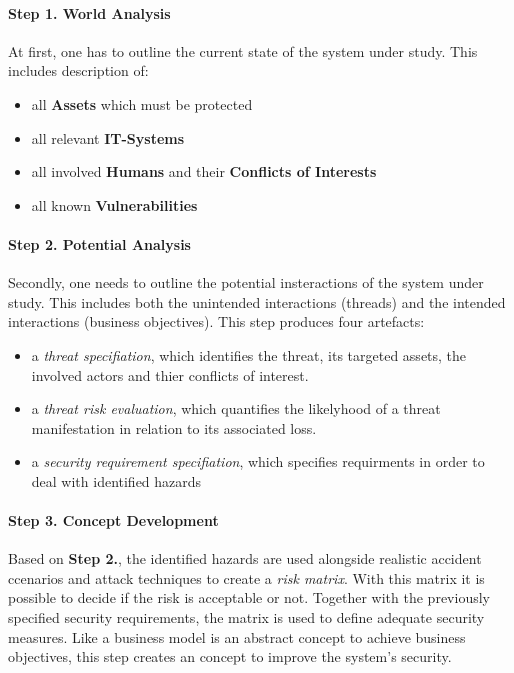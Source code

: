 

\paragraph*{Step 1. World Analysis}

At first, one has to outline the current state of the system under study. This includes description of:
\begin{itemize}
\item all \textbf{Assets} which must be protected
\item all relevant \textbf{IT-Systems}
\item all involved \textbf{Humans} and their \textbf{Conflicts of Interests}
\item all known \textbf{Vulnerabilities}
\end{itemize}

\paragraph*{Step 2. Potential Analysis}

Secondly, one needs to outline the potential insteractions of the system under study.
This includes both the unintended interactions (threads) and the intended interactions (business objectives).
This step produces four artefacts:
\begin{itemize}
\item a \emph{threat specifiation}, which identifies the threat, its targeted assets, the involved actors and thier conflicts of interest.
\item a \emph{threat risk evaluation}, which quantifies the likelyhood of a threat manifestation in relation to its associated loss.
\item a \emph{security requirement specifiation}, which specifies requirments in order to deal with identified hazards
\end{itemize}

\paragraph*{Step 3. Concept Development}

Based on \textbf{Step 2.}, the identified hazards are used alongside realistic accident ccenarios and attack techniques to create a \emph{risk matrix}.
With this matrix it is possible to decide if the risk is acceptable or not.
Together with the previously specified security requirements, the matrix is used to define adequate security measures.
Like a business model is an abstract concept to achieve business objectives, this step creates an concept to improve the system's security.

